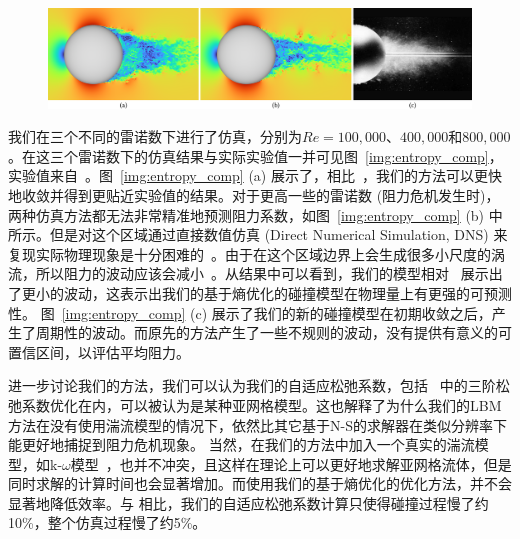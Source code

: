 \begin{figure}[!tb]
  \centering
    \includegraphics[width=0.99\columnwidth]{figures/wake_comp.png}
  \label{img:sphere_wake_comp}
\end{figure}

我们在三个不同的雷诺数下进行了仿真，分别为$Re=100,000$、$400,000$和$800,000$。在这三个雷诺数下的仿真结果与实际实验值一并可见图~\ref{img:entropy_comp}，实验值来自~\citep{Barati-2014}。图~\ref{img:entropy_comp} (a) 展示了，相比~\citep{Geier-2017}，我们的方法可以更快地收敛并得到更贴近实验值的结果。对于更高一些的雷诺数 (阻力危机发生时)，两种仿真方法都无法非常精准地预测阻力系数，如图~\ref{img:entropy_comp} (b) 中所示。但是对这个区域通过直接数值仿真 (Direct Numerical Simulation, DNS) 来复现实际物理现象是十分困难的~\citep{Tiwari-2020}。由于在这个区域边界上会生成很多小尺度的涡流，所以阻力的波动应该会减小~\citep{Deshpande-2017}。从结果中可以看到，我们的模型相对~\citep{Geier-2017} 展示出了更小的波动，这表示出我们的基于熵优化的碰撞模型在物理量上有更强的可预测性。
图~\ref{img:entropy_comp} (c) 展示了我们的新的碰撞模型在初期收敛之后，产生了周期性的波动。而原先的方法产生了一些不规则的波动，没有提供有意义的可置信区间，以评估平均阻力。

进一步讨论我们的方法，我们可以认为我们的自适应松弛系数，包括~\citep{Geier-2017} 中的三阶松弛系数优化在内，可以被认为是某种亚网格模型。这也解释了为什么我们的LBM方法在没有使用湍流模型的情况下，依然比其它基于N-S的求解器在类似分辨率下能更好地捕捉到阻力危机现象。
当然，在我们的方法中加入一个真实的湍流模型，如k-$\omega$模型~\citep{Menter-1994}，也并不冲突，且这样在理论上可以更好地求解亚网格流体，但是同时求解的计算时间也会显著增加。而使用我们的基于熵优化的优化方法，并不会显著地降低效率。与 \citep{Geier-2017} 相比，我们的自适应松弛系数计算只使得碰撞过程慢了约10\%，整个仿真过程慢了约5\%。

